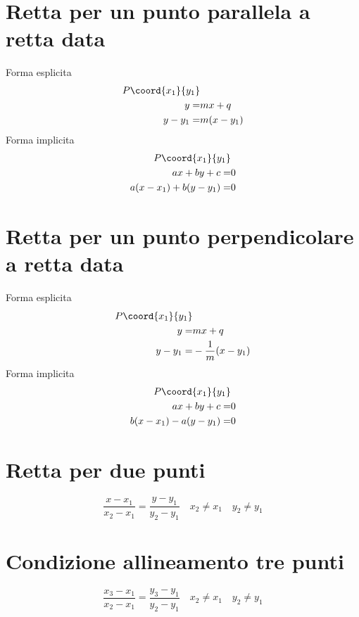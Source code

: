 \section{Retta per un punto parallela a retta data}
Forma esplicita
\begin{align}
P\coord{x_1}{y_1}&\nonumber\\
y=&mx+q\nonumber\\
y-y_1=&m(x-y_1)
\end{align}
Forma implicita
\begin{align}
P\coord{x_1}{y_1}&\nonumber\\
ax+by+c=&0\nonumber\\
a(x-x_1)+b(y-y_1)=&0
\end{align}
\section{Retta per un punto perpendicolare a retta data}
Forma esplicita
\begin{align}
P\coord{x_1}{y_1}&\nonumber\\
y=&mx+q\nonumber\\
y-y_1=&-\dfrac{1}{m}(x-y_1)
\end{align}
Forma implicita
\begin{align}
P\coord{x_1}{y_1}&\nonumber\\
ax+by+c=&0\nonumber\\
b(x-x_1)-a(y-y_1)=&0
\end{align}
\section{Retta per due punti}
\begin{equation}
\dfrac{x-x_1}{x_2-x_1}=\dfrac{y-y_1}{y_2-y_1}\quad x_2\neq x_1\quad y_2\neq y_1
\end{equation}
\section{Condizione allineamento tre  punti}
\begin{equation}
\dfrac{x_3-x_1}{x_2-x_1}=\dfrac{y_3-y_1}{y_2-y_1}\quad x_2\neq x_1\quad y_2\neq y_1
\end{equation}
